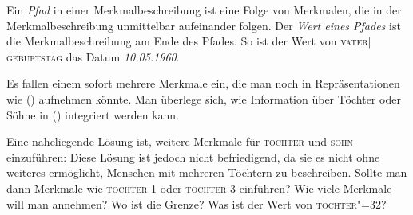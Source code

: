 Ein \emph{Pfad} in einer Merkmalbeschreibung ist eine Folge von Merkmalen, 
die in der Merkmalbeschreibung unmittelbar aufeinander folgen.
Der \emph{Wert eines Pfades} ist die Merkmalbeschreibung am Ende des Pfades. So ist
der Wert von \textsc{vater$|$geburtstag} das Datum \emph{10.05.1960}.

Es fallen einem sofort mehrere Merkmale ein, die man noch in Repräsentationen wie ()
aufnehmen könnte. Man überlege sich, wie Information über Töchter oder Söhne in 
() integriert werden kann.

Eine naheliegende Lösung ist, weitere Merkmale für \textsc{tochter} und \textsc{sohn}
einzuführen:
\ea
{}
\z
Diese Lösung ist jedoch nicht befriedigend, da sie es nicht ohne weiteres
ermöglicht, Menschen mit mehreren Töchtern zu beschreiben. Sollte man dann
Merkmale wie \textsc{toch\-ter-1} oder \textsc{tochter-3} einführen?
\ea
{}
\z
Wie viele Merkmale will man annehmen? Wo ist die Grenze?
Was ist der Wert von \textsc{tochter"=32}?

